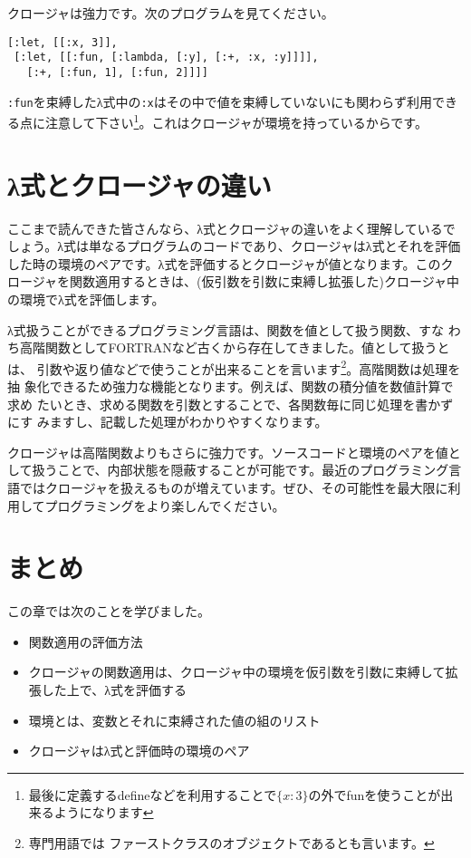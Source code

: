 クロージャは強力です。次のプログラムを見てください。

\begin{lstlisting}
[:let, [[:x, 3]],
 [:let, [[:fun, [:lambda, [:y], [:+, :x, :y]]]],
   [:+, [:fun, 1], [:fun, 2]]]]
\end{lstlisting}

{\tt :fun}を束縛したλ式中の{\tt :x}はその中で値を束縛していないにも関わらず利用できる点に注意して下さい\footnote{最後に定義するdefineなどを利用することで$\{x:3\}$の外でfunを使うことが出来るようになります}。これはクロージャが環境を持っているからです。

\section{λ式とクロージャの違い}

ここまで読んできた皆さんなら、λ式とクロージャの違いをよく理解しているでしょう。λ式は単なるプログラムのコードであり、クロージャはλ式とそれを評価した時の環境のペアです。λ式を評価するとクロージャが値となります。このクロージャを関数適用するときは、(仮引数を引数に束縛し拡張した)クロージャ中の環境でλ式を評価します。

λ式扱うことができるプログラミング言語は、関数を値として扱う関数、すな
わち高階関数としてFORTRANなど古くから存在してきました。値として扱うとは、
引数や返り値などで使うことが出来ることを言います\footnote{専門用語では
ファーストクラスのオブジェクトであるとも言います。}。高階関数は処理を抽
象化できるため強力な機能となります。例えば、関数の積分値を数値計算で求め
たいとき、求める関数を引数とすることで、各関数毎に同じ処理を書かずにす
みますし、記載した処理がわかりやすくなります。

クロージャは高階関数よりもさらに強力です。ソースコードと環境のペアを値として扱うことで、内部状態を隠蔽することが可能です。最近のプログラミング言語ではクロージャを扱えるものが増えています。ぜひ、その可能性を最大限に利用してプログラミングをより楽しんでください。

\section{まとめ}

この章では次のことを学びました。

\begin{itemize}
\item 関数適用の評価方法
\item クロージャの関数適用は、クロージャ中の環境を仮引数を引数に束縛して拡張した上で、λ式を評価する
\item 環境とは、変数とそれに束縛された値の組のリスト
\item クロージャはλ式と評価時の環境のペア
\end{itemize}



